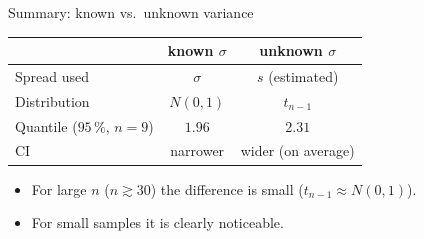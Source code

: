\documentclass[aspectratio=169,11pt]{beamer}
\begin{document}
\begin{frame}{Summary: known vs.\ unknown variance}
  \begin{center}
    \renewcommand{\arraystretch}{1.3}
    \begin{tabular}{lcc}
      \toprule
       & \textbf{known} $\sigma$ & \textbf{unknown} $\sigma$\\
      \midrule
      Spread used      & $\sigma$ & $s$ (estimated)\\
      Distribution     & $N(0,1)$ & $t_{n-1}$\\
      Quantile ($95\,\%$, $n=9$) & $1.96$ & $2.31$\\
      CI               & narrower & wider (on average)\\
      \bottomrule
    \end{tabular}
  \end{center}
  \begin{itemize}
    \item For large $n$ ($n \gtrsim 30$) the difference is small
          ($t_{n-1}\approx N(0,1)$).
    \item For small samples it is clearly noticeable.
  \end{itemize}
\end{frame}
\end{document}
